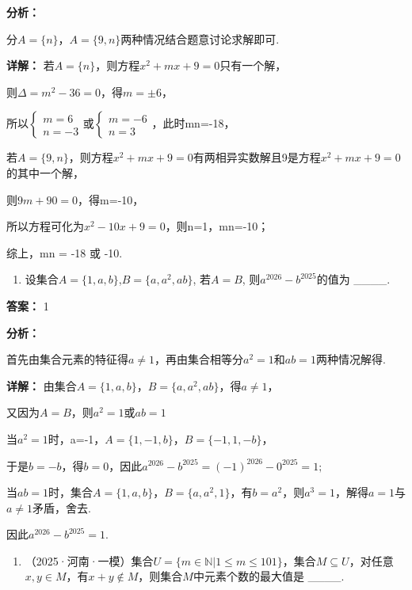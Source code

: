 \documentclass[11pt,a4paper]{ctexart}
\begin{document}
\textbf{分析：}

分\(A=\{n\}\)，\(A=\{9,n\}\)两种情况结合题意讨论求解即可.

\textbf{详解：}
若\(A=\{n\}\)，则方程\(x^{2}+mx+9=0\)只有一个解，

则\(\Delta=m^{2}-36=0\)，得\(m=\pm6\)，

所以\(\left\{\begin{aligned}m=6\\ n=-3\end{aligned}\right.\)或\(\left\{\begin{aligned}m=-6\\ n=3\end{aligned}\right.\)，此时mn=-18，

若\(A=\{9,n\}\)，则方程\(x^{2}+mx+9=0\)有两相异实数解且9是方程\(x^{2}+mx+9=0\)的其中一个解，

则\(9m+90=0\)，得m=-10，

所以方程可化为\(x^{2}-10x+9=0\)，则n=1，mn=-10；

综上，mn = -18 或 -10.

\begin{enumerate}[label=\arabic*., leftmargin=*, start=4]
\item 设集合\(A = \{1, a, b\}\),\(B = \{a, a^2, ab\}\), 若\(A = B\),
  则\(a^{2026} - b^{2025}\)的值为 \_\_\_\_.
\end{enumerate}

\textbf{答案：}
1

\textbf{分析：}

首先由集合元素的特征得\(a \neq 1\)，再由集合相等分\(a^2 = 1\)和\(ab = 1\)两种情况解得.

\textbf{详解：}
由集合\(A=\{1,a,b\}\)，\(B=\{a,a^{2},ab\}\)，得\(a\neq1\)，

又因为\(A = B\)，则\(a^2 = 1\)或\(ab = 1\)

当\(a^{2}=1\)时，a=-1，\(A=\{1,-1,b\}\)，\(B=\{-1,1,-b\}\)，

于是\(b = -b\)，得\(b = 0\)，因此\(a^{2026} - b^{2025} = (-1)^{2026} - 0^{2025} = 1;\)

当\(ab = 1\)时，集合\(A = \{1, a, b\}\)，\(B = \{a, a^2, 1\}\)，有\(b = a^2\)，则\(a^3 = 1\)，解得\(a = 1\)与\(a \neq 1\)矛盾，舍去.

因此\(a^{2026}-b^{2025}=1\).

\begin{enumerate}[label=\arabic*., leftmargin=*, start=5]
\item （2025·河南·一模）集合\(U = \{m \in \mathbb{N} | 1 \leq m \leq 101\}\)，集合\(M \subseteq U\)，对任意\(x, y \in M\)，有\(x + y \notin M\)，则集合\(M\)中元素个数的最大值是
  \_\_\_\_.
\end{enumerate}
\end{document}
